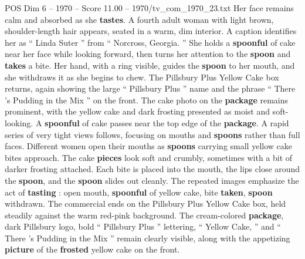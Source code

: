 \begin{textsample}{POS Dim 6 – 1970 – Score 11.00 – 1970/tv\_com\_1970\_23.txt}
Her face remains calm and absorbed as she \textbf{tastes}.
A fourth adult woman with light brown, shoulder-length hair appears, seated in a warm, dim interior.
A caption identifies her as “ Linda Suter ” from “ Norcross, Georgia. ” She holds a \textbf{spoonful} of cake near her face while looking forward, then turns her attention to the \textbf{spoon} and \textbf{takes} a bite.
Her hand, with a ring visible, guides the \textbf{spoon} to her mouth, and she withdraws it as she begins to chew.
The Pillsbury Plus Yellow Cake box returns, again showing the large “ Pillsbury Plus ” name and the phrase “ There ’s Pudding in the Mix ” on the front.
The cake photo on the \textbf{package} remains prominent, with the yellow cake and dark frosting presented as moist and soft-looking.
A \textbf{spoonful} of cake passes near the top edge of the \textbf{package}.
A rapid series of very tight views follows, focusing on mouths and \textbf{spoons} rather than full faces.
Different women open their mouths as \textbf{spoons} carrying small yellow cake bites approach.
The cake \textbf{pieces} look soft and crumbly, sometimes with a bit of darker frosting attached.
Each bite is placed into the mouth, the lips close around the \textbf{spoon}, and the \textbf{spoon} slides out cleanly.
The repeated images emphasize the act of \textbf{tasting} : open mouth, \textbf{spoonful} of yellow cake, bite \textbf{taken}, \textbf{spoon} withdrawn.
The commercial ends on the Pillsbury Plus Yellow Cake box, held steadily against the warm red-pink background.
The cream-colored \textbf{package}, dark Pillsbury logo, bold “ Pillsbury Plus ” lettering, “ Yellow Cake, ” and “ There ’s Pudding in the Mix ” remain clearly visible, along with the appetizing \textbf{picture} of the \textbf{frosted} yellow cake on the front.

\end{textsample}
